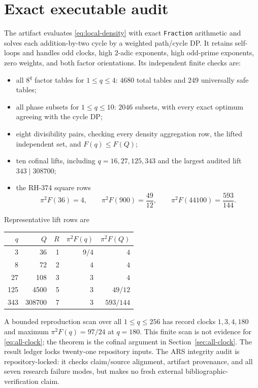 \documentclass[11pt]{article}
\theoremstyle{definition}
\theoremstyle{remark}
\begin{document}
\section{Exact executable audit}

The artifact evaluates \eqref{eq:local-density} with exact
\texttt{Fraction} arithmetic and solves each addition-by-two cycle by a
weighted path/cycle DP.  It retains self-loops and handles odd clocks, high
$2$-adic exponents, high odd-prime exponents, zero weights, and both factor
orientations.  Its independent finite checks are:
\begin{itemize}[leftmargin=*]
\item all $8^q$ factor tables for $1\le q\le4$: $4680$ total tables and
  $249$ universally safe tables;
\item all phase subsets for $1\le q\le10$: $2046$ subsets, with every exact
  optimum agreeing with the cycle DP;
\item eight divisibility pairs, checking every density aggregation row, the
  lifted independent set, and $F(q)\le F(Q)$;
\item ten cofinal lifts, including $q=16,27,125,343$ and the largest audited
  lift $343\mid308700$;
\item the RH-374 square rows
  \[
   \pi^2F(36)=4,\qquad \pi^2F(900)=\frac{49}{12},\qquad
   \pi^2F(44100)=\frac{593}{144}.
  \]
\end{itemize}
Representative lift rows are
\begin{center}
\begin{tabular}{@{}rrrrr@{}}
\toprule
$q$ & $Q$ & $R$ & $\pi^2F(q)$ & $\pi^2F(Q)$\\
\midrule
3 & 36 & 1 & $9/4$ & $4$\\
8 & 72 & 2 & $4$ & $4$\\
27 & 108 & 3 & $3$ & $4$\\
125 & 4500 & 5 & $3$ & $49/12$\\
343 & 308700 & 7 & $3$ & $593/144$\\
\bottomrule
\end{tabular}
\end{center}

A bounded reproduction scan over all $1\le q\le256$ has record clocks
$1,3,4,180$ and maximum $\pi^2F(q)=97/24$ at $q=180$.  This finite scan is
not evidence for \eqref{eq:all-clock}; the theorem is the cofinal argument in
Section~\ref{sec:all-clock}.  The result ledger locks twenty-one repository
inputs.  The ARS
integrity audit is repository-locked: it checks claim/source alignment,
artifact provenance, and all seven research failure modes, but makes no fresh
external bibliographic-verification claim.
\end{document}
